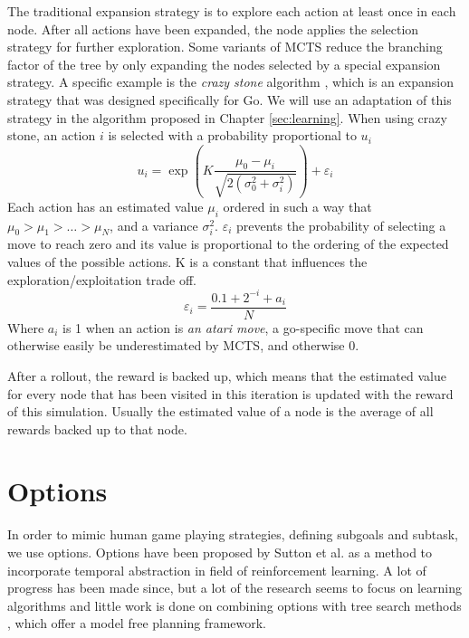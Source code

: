 The traditional expansion strategy is to explore each action at least once in
each node. After all actions have been expanded, the node applies the selection
strategy for further exploration. Some variants of MCTS reduce the branching
factor of the tree by only expanding the nodes selected by a special expansion
strategy. A specific example is the \emph{crazy stone} algorithm
\cite{coulom2007efficient}, which is an expansion strategy that was designed
specifically for Go. We will use an adaptation of this strategy in the algorithm
proposed in Chapter \ref{sec:learning}.  When using crazy stone, an action $i$
is selected with a probability proportional to $u_i$
\begin{equation}
	\label{eq:crazystone}
	u_i = \exp\left(K \frac{\mu_0 - \mu_i}{\sqrt{2\left(\sigma_0^2 +
\sigma_i^2\right)}}\right) + \varepsilon_i
\end{equation}
Each action has an estimated value $\mu_i$ ordered in such a way that $\mu_0 >
\mu_1 > \ldots > \mu_N$, and a variance $\sigma_i^2$. $\varepsilon_i$ prevents 
the probability of selecting a move to reach zero and its value is proportional to
the ordering of the expected values of the possible actions. K is a constant
that influences the exploration/exploitation trade off.
\begin{equation}
	\label{eq:epsilon}
	\varepsilon_i = \frac{0.1 + 2^{-i} + a_i}{N}
\end{equation}
Where $a_i$ is 1 when an action is \emph{an atari move}, a go-specific
move that can otherwise easily be underestimated by MCTS, and otherwise 0.

After a rollout, the reward is backed up, which means that the estimated value
for every node that has been visited in this iteration is updated with the
reward of this simulation. Usually the estimated value of a node is the average
of all rewards backed up to that node.


\section{Options}
\label{subsec:options}

In order to mimic human game playing strategies, defining subgoals and subtask,
we use options. Options have been proposed by Sutton et al.
\cite{sutton1999between} as a method to incorporate temporal abstraction in
field of reinforcement learning. A lot of progress has been made since, but a
lot of the research seems to focus on learning algorithms and little work is
done on combining options with tree search methods \cite{barto2003recent}, which
offer a model free planning framework.

